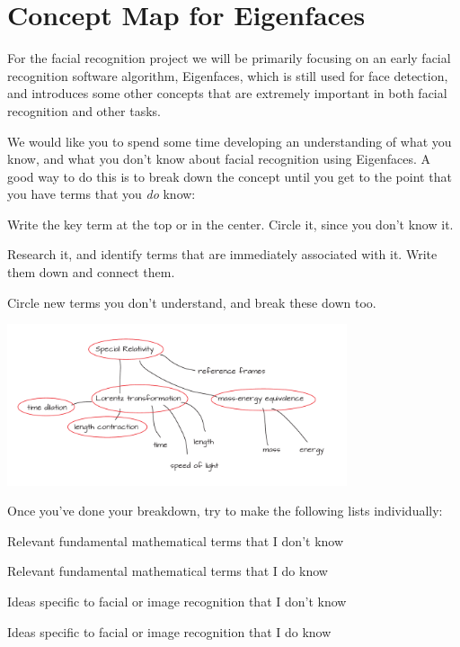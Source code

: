 \section{Concept Map for Eigenfaces}

For the facial recognition project we will be primarily focusing on an early facial recognition software algorithm, Eigenfaces, which is still used for face detection, and introduces some other concepts that are extremely important in both facial recognition and other tasks.

We would like you to spend some time developing an understanding of what you know, and what you don't know about facial recognition using Eigenfaces.  A good way to do this is to break down the concept until you get to the point that you have terms that you \textit{do} know:
\be
\item Write the key term at the top or in the center.  Circle it, since you don't know it.
\item Research it, and identify terms that are immediately associated with it.  Write them down and connect them.
\item Circle new terms you don't understand, and break these down too.
\ee

\begin{center}
\includegraphics[width=0.75\textwidth]{FacesDay1/figs/ConceptBreakdown.pdf}
\end{center}

Once you've done your breakdown, try to make the following lists individually:
\be
\item Relevant fundamental mathematical terms that I don't know
\item Relevant fundamental mathematical terms that I do know
\item Ideas specific to facial or image recognition that I don't know
\item Ideas specific to facial or image recognition that I do know
\ee

\pagebreak
\shipoutAnswer
